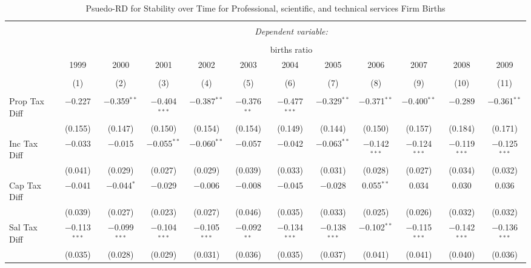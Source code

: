
\begin{table}[!htbp] \centering 
  \caption{Psuedo-RD for Stability over Time for  Professional, scientific, and technical services Firm Births} 
  \label{54year} 
\small 
\begin{tabular}{@{\extracolsep{5pt}}lccccccccccc} 
\\[-1.8ex]\hline 
\hline \\[-1.8ex] 
 & \multicolumn{11}{c}{\textit{Dependent variable:}} \\ 
\cline{2-12} 
\\[-1.8ex] & \multicolumn{11}{c}{births ratio} \\ 
 & 1999 & 2000 & 2001 & 2002 & 2003 & 2004 & 2005 & 2006 & 2007 & 2008 & 2009 \\ 
\\[-1.8ex] & (1) & (2) & (3) & (4) & (5) & (6) & (7) & (8) & (9) & (10) & (11)\\ 
\hline \\[-1.8ex] 
 Prop Tax Diff & $-$0.227 & $-$0.359$^{**}$ & $-$0.404$^{***}$ & $-$0.387$^{**}$ & $-$0.376$^{**}$ & $-$0.477$^{***}$ & $-$0.329$^{**}$ & $-$0.371$^{**}$ & $-$0.400$^{**}$ & $-$0.289 & $-$0.361$^{**}$ \\ 
  & (0.155) & (0.147) & (0.150) & (0.154) & (0.154) & (0.149) & (0.144) & (0.150) & (0.157) & (0.184) & (0.171) \\ 
  Inc Tax Diff & $-$0.033 & $-$0.015 & $-$0.055$^{**}$ & $-$0.060$^{**}$ & $-$0.057 & $-$0.042 & $-$0.063$^{**}$ & $-$0.142$^{***}$ & $-$0.124$^{***}$ & $-$0.119$^{***}$ & $-$0.125$^{***}$ \\ 
  & (0.041) & (0.029) & (0.027) & (0.029) & (0.039) & (0.033) & (0.031) & (0.028) & (0.027) & (0.034) & (0.032) \\ 
  Cap Tax Diff & $-$0.041 & $-$0.044$^{*}$ & $-$0.029 & $-$0.006 & $-$0.008 & $-$0.045 & $-$0.028 & 0.055$^{**}$ & 0.034 & 0.030 & 0.036 \\ 
  & (0.039) & (0.027) & (0.023) & (0.027) & (0.046) & (0.035) & (0.033) & (0.025) & (0.026) & (0.032) & (0.032) \\ 
  Sal Tax Diff & $-$0.113$^{***}$ & $-$0.099$^{***}$ & $-$0.104$^{***}$ & $-$0.105$^{***}$ & $-$0.092$^{**}$ & $-$0.134$^{***}$ & $-$0.138$^{***}$ & $-$0.102$^{**}$ & $-$0.115$^{***}$ & $-$0.142$^{***}$ & $-$0.136$^{***}$ \\ 
  & (0.035) & (0.028) & (0.029) & (0.031) & (0.036) & (0.035) & (0.037) & (0.041) & (0.041) & (0.040) & (0.036) \\ 

\end{tabular}
\end{table}

